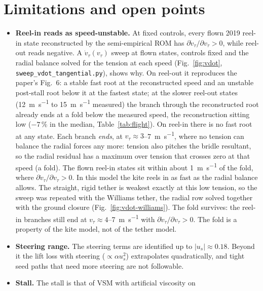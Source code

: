 \documentclass[11pt,a4paper]{article}
\newcommand{\code}[1]{\texttt{\small #1}}
\begin{document}
\section{Limitations and open points}
\label{sec:open}
\begin{itemize}
  \item \textbf{Reel-in reads as speed-unstable.} At fixed controls, every
        flown 2019 reel-in state reconstructed by the semi-empirical ROM has
        $\partial\dot v_\tau/\partial v_\tau>0$, while reel-out reads
        negative. A $\dot v_\tau(v_\tau)$ sweep at flown states, controls fixed and
        the radial balance solved for the tension at each speed
        (Fig.~\ref{fig:vdot}, \code{sweep\_vdot\_tangential.py}), shows why. On
        reel-out it reproduces the paper's Fig.~6: a stable fast root at the
        reconstructed speed and an unstable post-stall root below it at the
        fastest state; at the slower reel-out states (\SI{12}{\metre\per\second}
        to \SI{15}{\metre\per\second} measured) the branch through the
        reconstructed root already ends at a fold below the measured speed,
        the reconstruction sitting low ($-7\,\%$ in the median,
        Table~\ref{tab:flight}). On reel-in there is no fast root at any
        state. Each branch \emph{ends}, at
        $v_\tau\approx3$--\SI{7}{\metre\per\second}, where no tension can
        balance the radial forces any more: tension also pitches the bridle
        resultant, so the radial residual has a maximum over tension that
        crosses zero at that speed (a fold). The flown reel-in states sit
        within about \SI{1}{\metre\per\second} of the fold, where
        $\partial\dot v_\tau/\partial v_\tau>0$. In this model the kite reels in
        as fast as the radial balance allows. The straight, rigid tether is
        weakest exactly at this low tension, so the sweep was repeated with the
        Williams tether, the radial row solved together with the ground
        closure (Fig.~\ref{fig:vdot-williams}). The fold survives: the reel-in
        branches still end at $v_\tau\approx4$--\SI{7}{\metre\per\second}
        with $\partial\dot v_\tau/\partial v_\tau>0$. The fold is a property
        of the kite model, not of the tether model.
  \item \textbf{Steering range.} The steering terms are identified up to
        $|u_s|\approx0.18$. Beyond it the lift loss with steering
        ($\propto\alpha u_s^2$) extrapolates quadratically, and tight seed
        paths that need more steering are not followable.
  \item \textbf{Stall.} The stall is that of VSM with artificial viscosity on

\end{itemize}
\end{document}

